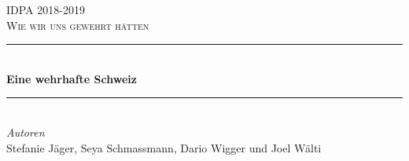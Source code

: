 \begin{titlepage} %
	\newcommand{\HRule}{\rule{\linewidth}{0.5mm}} %
	
	\center %
	
	
	\textsc{\LARGE IDPA 2018-2019}\\[1.5cm] %
	
	\textsc{\Large Wie wir uns gewehrt hätten}\\[0.5cm] %
	
	
	\HRule\\[0.4cm]
	
	{\huge\bfseries Eine wehrhafte Schweiz}\\[0.4cm] %
	
	\HRule\\[1.5cm]
	
	
	
	{\large\textit{Autoren}}\\
	Stefanie Jäger, %
	Seya Schmassmann, %
	Dario Wigger und %
	Joel Wälti %
	

\end{titlepage}
